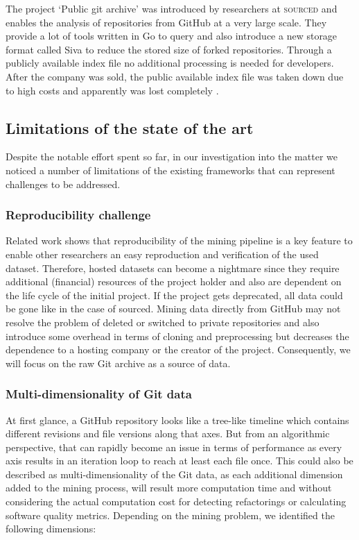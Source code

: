 The project `Public git archive' was introduced by researchers at \textsc{sourced} and enables the analysis of repositories from GitHub at a very large scale. They provide a lot of tools written in Go to query and also introduce a new storage format called Siva to reduce the stored size of forked repositories. Through a publicly available index file no additional processing is needed for developers. After the company was sold, the public available index file was taken down due to high costs and apparently was lost completely \cite{srcdissue}.

\subsection{Limitations of the state of the art}
Despite the notable effort spent so far, in our investigation into the matter we noticed a number of limitations of the existing frameworks that can represent challenges to be addressed. 

\subsubsection{Reproducibility challenge}
Related work shows that reproducibility of the mining pipeline is a key feature to enable other researchers an easy reproduction and verification of the used dataset. Therefore, hosted datasets can become a nightmare since they require additional (financial) resources of the project holder and also are dependent on the life cycle of the initial project. If the project gets deprecated, all data could be gone like in the case of sourced. Mining data directly from GitHub may not resolve the problem of deleted or switched to private repositories and also introduce some overhead in terms of cloning and preprocessing but decreases the dependence to a hosting company or the creator of the project. Consequently, we will focus on the raw Git archive as a source of data.

\subsubsection{Multi-dimensionality of Git data}
At first glance, a GitHub repository looks like a tree-like timeline which contains different revisions and file versions along that axes. But from an algorithmic perspective, that can rapidly become an issue in terms of performance as every axis results in an iteration loop to reach at least each file once. This could also be described as multi-dimensionality of the Git data, as each additional dimension added to the mining process, will result more computation time and without considering the actual computation cost for detecting refactorings or calculating software quality metrics. Depending on the mining problem, we identified the following dimensions:

